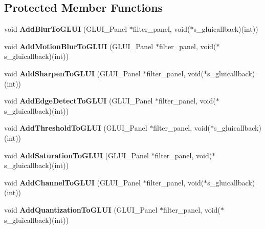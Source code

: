 \subsection*{Protected Member Functions}
\begin{DoxyCompactItemize}
\item 
void {\bfseries Add\+Blur\+To\+G\+L\+UI} (G\+L\+U\+I\+\_\+\+Panel $\ast$filter\+\_\+panel, void($\ast$s\+\_\+gluicallback)(int))\hypertarget{classimage__tools_1_1FilterManager_ae85ce9fc1146be4b403187064bb7cd97}{}\label{classimage__tools_1_1FilterManager_ae85ce9fc1146be4b403187064bb7cd97}

\item 
void {\bfseries Add\+Motion\+Blur\+To\+G\+L\+UI} (G\+L\+U\+I\+\_\+\+Panel $\ast$filter\+\_\+panel, void($\ast$s\+\_\+gluicallback)(int))\hypertarget{classimage__tools_1_1FilterManager_a023cb6f79a31c7635c73aed94ad8f684}{}\label{classimage__tools_1_1FilterManager_a023cb6f79a31c7635c73aed94ad8f684}

\item 
void {\bfseries Add\+Sharpen\+To\+G\+L\+UI} (G\+L\+U\+I\+\_\+\+Panel $\ast$filter\+\_\+panel, void($\ast$s\+\_\+gluicallback)(int))\hypertarget{classimage__tools_1_1FilterManager_aaeaa991e824af5651604240bf6841f4d}{}\label{classimage__tools_1_1FilterManager_aaeaa991e824af5651604240bf6841f4d}

\item 
void {\bfseries Add\+Edge\+Detect\+To\+G\+L\+UI} (G\+L\+U\+I\+\_\+\+Panel $\ast$filter\+\_\+panel, void($\ast$s\+\_\+gluicallback)(int))\hypertarget{classimage__tools_1_1FilterManager_a8ea1737814292a8248e87f68772bba84}{}\label{classimage__tools_1_1FilterManager_a8ea1737814292a8248e87f68772bba84}

\item 
void {\bfseries Add\+Threshold\+To\+G\+L\+UI} (G\+L\+U\+I\+\_\+\+Panel $\ast$filter\+\_\+panel, void($\ast$s\+\_\+gluicallback)(int))\hypertarget{classimage__tools_1_1FilterManager_a7886a22bba28b6a4d47e4da8dcf6e500}{}\label{classimage__tools_1_1FilterManager_a7886a22bba28b6a4d47e4da8dcf6e500}

\item 
void {\bfseries Add\+Saturation\+To\+G\+L\+UI} (G\+L\+U\+I\+\_\+\+Panel $\ast$filter\+\_\+panel, void($\ast$s\+\_\+gluicallback)(int))\hypertarget{classimage__tools_1_1FilterManager_a7d6d4cefdcf8cf23ae5467ed220d8ffe}{}\label{classimage__tools_1_1FilterManager_a7d6d4cefdcf8cf23ae5467ed220d8ffe}

\item 
void {\bfseries Add\+Channel\+To\+G\+L\+UI} (G\+L\+U\+I\+\_\+\+Panel $\ast$filter\+\_\+panel, void($\ast$s\+\_\+gluicallback)(int))\hypertarget{classimage__tools_1_1FilterManager_afe7ab6a2f6de62dc1b3b4c1d4350ddbe}{}\label{classimage__tools_1_1FilterManager_afe7ab6a2f6de62dc1b3b4c1d4350ddbe}

\item 
void {\bfseries Add\+Quantization\+To\+G\+L\+UI} (G\+L\+U\+I\+\_\+\+Panel $\ast$filter\+\_\+panel, void($\ast$s\+\_\+gluicallback)(int))\hypertarget{classimage__tools_1_1FilterManager_ae13d0c9858da16b283bdf71ee2b4ad8f}{}\label{classimage__tools_1_1FilterManager_ae13d0c9858da16b283bdf71ee2b4ad8f}

\end{DoxyCompactItemize}
